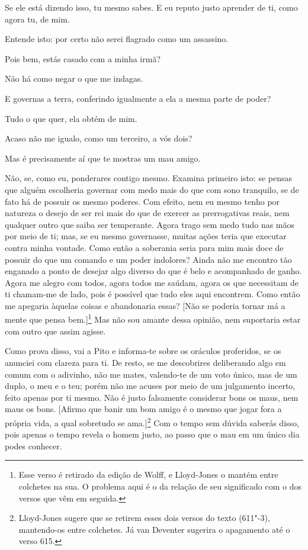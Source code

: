    Se ele está dizendo isso, tu mesmo sabes. E eu reputo justo aprender de
ti, como agora tu, de mim.

   Entende isto: por certo não serei flagrado como um assassino.

   Pois bem, estás casado com a minha irmã?

   Não há como negar o que me indagas.

   E governas a terra, conferindo igualmente a ela a mesma parte de poder?

   Tudo o que quer,  ela obtém de mim.

   Acaso não me igualo, como um terceiro, a vós dois?

   Mas é precisamente aí que te mostras um mau amigo.

   Não, se, como eu, ponderares contigo mesmo. Examina primeiro isto: se
pensas que alguém escolheria governar com medo mais do que com sono
tranquilo, se de fato há de possuir os mesmo poderes. Com efeito, nem eu
mesmo tenho por natureza o desejo de ser rei mais do que de exercer as
prerrogativas reais, nem qualquer outro que saiba ser temperante.
Agora trago sem medo tudo nas mãos por meio de ti; mas, se eu mesmo
governasse, muitas ações teria que executar contra minha vontade. Como
então a soberania seria para mim mais doce de possuir do que um comando
e um poder indolores? Ainda não me encontro tão enganado a ponto de
desejar algo diverso do que é belo e acompanhado de ganho. Agora me
alegro com todos, agora todos me saúdam, agora os que necessitam de ti
chamam-me de lado, pois é possível que tudo eles aqui encontrem. Como
então me apegaria àquelas coisas e abandonaria essas? {[}Não se
poderia tornar má a mente que pensa bem.{]}\footnote{Esse verso é
  retirado da edição de Wolff, e Lloyd-Jones o mantém entre colchetes na
  sua. O problema aqui é o da relação de seu significado com o dos
  versos que vêm em seguida.} Mas não sou amante dessa opinião, nem
suportaria estar com outro que assim agisse.

Como prova disso, vai a Pito e informa-te sobre os oráculos proferidos,
se os anunciei com clareza para ti. De resto, se me descobrires
deliberando algo em comum com o adivinho, não me mates, valendo-te de um
voto único, mas de um duplo, o meu e o teu; porém não me acuses por meio
de um julgamento incerto, feito apenas por ti mesmo. Não é justo
falsamente considerar bons os maus, nem maus os bons. {[}Afirmo que
banir um bom amigo é o mesmo que jogar fora a própria vida, a qual
sobretudo se ama.{]}\footnote{Lloyd-Jones sugere que se retirem esses
  dois versos do texto (611"-3), mantendo-os entre colchetes. Já van
  Deventer sugerira o apagamento até o verso 615.} Com o tempo sem
dúvida saberás disso, pois apenas o tempo revela o homem justo, ao passo
que o mau em um único dia podes conhecer.

